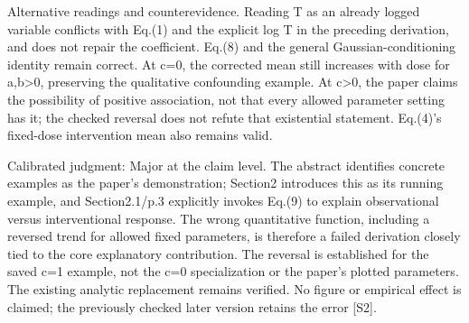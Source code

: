 \documentclass[10pt]{article}
\begin{document}
Alternative readings and counterevidence. Reading T as an already logged variable conflicts with Eq.(1) and the explicit log T in the preceding derivation, and does not repair the coefficient. Eq.(8) and the general Gaussian-conditioning identity remain correct. At c=0, the corrected mean still increases with dose for a,b>0, preserving the qualitative confounding example. At c>0, the paper claims the possibility of positive association, not that every allowed parameter setting has it; the checked reversal does not refute that existential statement. Eq.(4)’s fixed-dose intervention mean also remains valid.\par
Calibrated judgment: Major at the claim level. The abstract identifies concrete examples as the paper’s demonstration; Section2 introduces this as its running example, and Section2.1/p.3 explicitly invokes Eq.(9) to explain observational versus interventional response. The wrong quantitative function, including a reversed trend for allowed fixed parameters, is therefore a failed derivation closely tied to the core explanatory contribution. The reversal is established for the saved c=1 example, not the c=0 specialization or the paper’s plotted parameters. The existing analytic replacement remains verified. No figure or empirical effect is claimed; the previously checked later version retains the error [S2].\par
\end{document}

